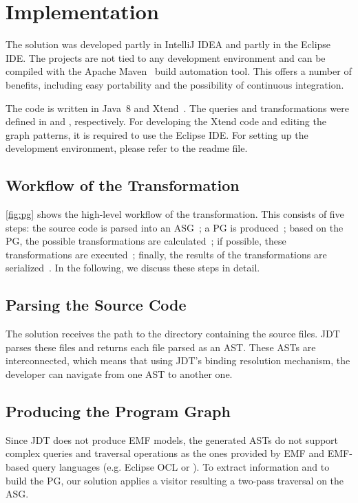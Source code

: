 \documentclass[submission,copyright,creativecommons]{eptcs}
\begin{document}
\section{Implementation}

The solution was developed partly in IntelliJ IDEA and partly in the Eclipse IDE. The projects are not tied to any development environment and can be compiled with the Apache Maven~\cite{Maven} build automation tool. This offers a number of benefits, including easy portability and the possibility of continuous integration.

The code is written in Java~8 and Xtend~\cite{Xtend}. The queries and transformations were defined in \eiq and \viatra, respectively. For developing the Xtend code and editing the graph patterns, it is required to use the Eclipse IDE. For setting up the development environment, please refer to the readme file. 

\subsection{Workflow of the Transformation}


\noindent\autoref{fig:pg} shows the high-level workflow of the transformation. This consists of five steps: the source code is parsed into an ASG~; a PG is produced~; based on the PG, the possible transformations are calculated~; if possible, these transformations are executed~; finally, the results of the transformations are serialized~. In the following, we discuss these steps in detail.

\subsection[Parsing the Source Code]{Parsing the Source Code\qquad{}}
The solution receives the path to the directory containing the source files. JDT parses these files and returns each file parsed as an AST. These ASTs are interconnected, which means that using JDT's binding resolution mechanism, the developer can navigate from one AST to another one.

\subsection[Producing the Program Graph]{Producing the Program Graph\qquad{}}
Since JDT does not produce EMF models, the generated ASTs do not support complex queries and traversal operations as the ones provided by EMF and EMF-based query languages (e.g. Eclipse OCL or \eiq). To extract information and to build the PG, our solution applies a visitor resulting a two-pass traversal on the ASG.
\end{document}
